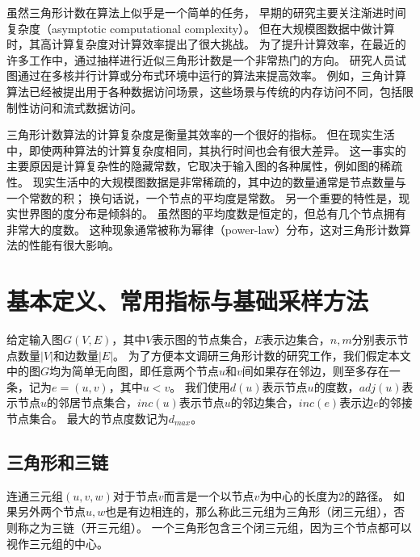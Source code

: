 虽然三角形计数在算法上似乎是一个简单的任务，
早期的研究主要关注渐进时间复杂度（asymptotic computational complexity）\citep{itai1978finding, alon1997finding}。
但在大规模图数据中做计算时，其高计算复杂度对计算效率提出了很大挑战。
为了提升计算效率，在最近的许多工作中，通过抽样进行近似三角形计数是一个非常热门的方向\citep{tsourakakis2008fast,rahman2014sampling,rahman2013approximate,tsourakakis2009doulion,jha2015space,seshadhri2013triadic}。
研究人员试图通过在多核并行计算或分布式环境中运行的算法来提高效率\citep{rahman2013approximate,tsourakakis2009doulion,suri2011counting}。
例如，三角计算算法已经被提出用于各种数据访问场景，这些场景与传统的内存访问不同，包括限制性访问\citep{rahman2014sampling}和流式数据访问\citep{seshadhri2013triadic,buriol2006counting}。

三角形计数算法的计算复杂度是衡量其效率的一个很好的指标。
但在现实生活中，即使两种算法的计算复杂度相同，其执行时间也会有很大差异。
这一事实的主要原因是计算复杂性的隐藏常数，它取决于输入图的各种属性，例如图的稀疏性。
现实生活中的大规模图数据是非常稀疏的，其中边的数量通常是节点数量与一个常数的积；
换句话说，一个节点的平均度是常数。
另一个重要的特性是，现实世界图的度分布是倾斜的。
虽然图的平均度数是恒定的，但总有几个节点拥有非常大的度数。
这种现象通常被称为幂律（power-law）分布\citep{barabasi1999emergence}，这对三角形计数算法的性能有很大影响。

\section{基本定义、常用指标与基础采样方法}

给定输入图$G(V,E)$，其中$V$表示图的节点集合，$E$表示边集合，$n,m$分别表示节点数量$|V|$和边数量$|E|$。
为了方便本文调研三角形计数的研究工作，我们假定本文中的图$G$均为简单无向图，即任意两个节点$u$和$v$间如果存在邻边，则至多存在一条，记为$e=(u,v)$，其中$u < v$。
我们使用$d(u)$表示节点$u$的度数，$adj(u)$表示节点$u$的邻居节点集合，$inc(u)$表示节点$u$的邻边集合，$inc(e)$表示边$e$的邻接节点集合。
最大的节点度数记为$d_{max}$。

\subsection{三角形和三链}

连通三元组$(u,v,w)$对于节点$v$而言是一个以节点$v$为中心的长度为2的路径。
如果另外两个节点$u,w$也是有边相连的，那么称此三元组为三角形（闭三元组），否则称之为三链（开三元组）。
一个三角形包含三个闭三元组，因为三个节点都可以视作三元组的中心。

